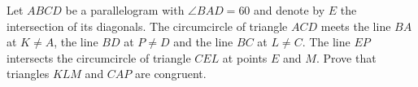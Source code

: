 Let $ ABCD$ be a parallelogram with $ \angle BAD = 60$ and denote by $ E$ the intersection of its diagonals. The circumcircle of triangle $ ACD$ meets the line $ BA$ at $ K \ne A$,  the line $ BD$ at $ P \ne D$ and the line $ BC$ at $ L\ne C$. The line $ EP$ intersects the circumcircle of triangle $ CEL$ at points $ E$ and $ M$. Prove that triangles $ KLM$ and $ CAP$ are congruent.